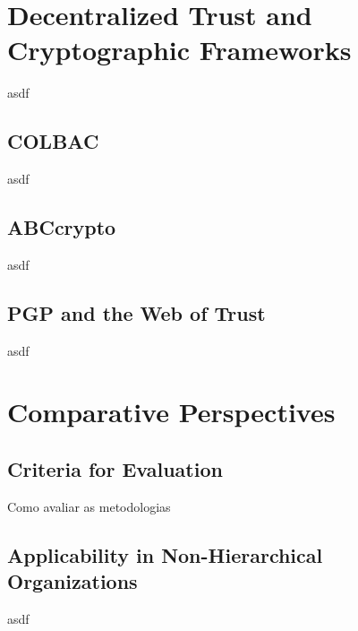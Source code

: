 \section{Decentralized Trust and Cryptographic Frameworks}
\label{sec:decentralized_cryptographic}
asdf

\subsection{COLBAC}
\label{subsec:colbac}
asdf

\subsection{ABCcrypto}
\label{subsec:abccrypto}
asdf

\subsection{PGP and the Web of Trust}
\label{subsec:pgp_web_of_trust}
asdf





\section{Comparative Perspectives}
\label{sec:comparative_perspectives}

\subsection{Criteria for Evaluation}
\label{subsec:criteria_evaluation}
Como avaliar as metodologias  

\subsection{Applicability in Non-Hierarchical Organizations}
\label{subsec:applicability_non_hierarchical}

asdf